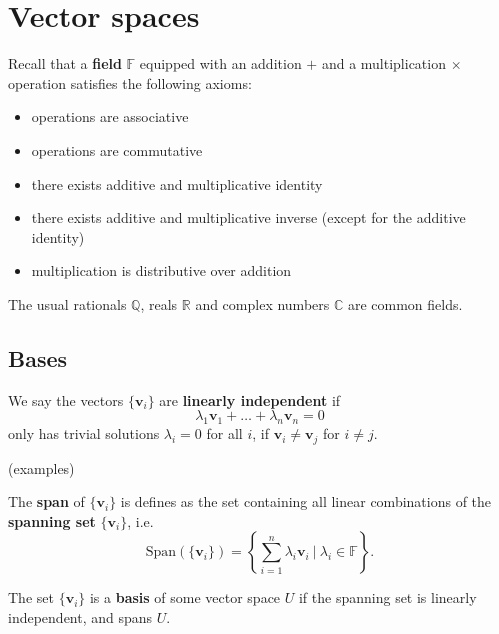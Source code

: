 \documentclass[letter-paper]{tufte-book}
\begin{document}

\chapter{Vector spaces}

Recall that a \textbf{field} $\mathbb{F}$ equipped with an addition $+$ and a
multiplication $\times$ operation satisfies the following axioms:
\begin{itemize}
  \item operations are associative
  \item operations are commutative
  \item there exists additive and multiplicative identity
  \item there exists additive and multiplicative inverse (except for the
  additive identity)
  \item multiplication is distributive over addition
\end{itemize}

The usual rationals $\mathbb{Q}$, reals $\mathbb{R}$ and complex numbers
$\mathbb{C}$ are common fields.


\section{Bases}

We say the vectors $\{\boldsymbol{v}_i\}$ are \textbf{linearly independent} if
\begin{equation}
  \lambda_1 \boldsymbol{v}_1 + \ldots + \lambda_n \boldsymbol{v}_n = 0
\end{equation}
only has trivial solutions $\lambda_i = 0$ for all $i$, if $\boldsymbol{v}_i
\neq \boldsymbol{v}_j$ for $i\neq j$.

(examples)

The \textbf{span} of $\{\boldsymbol{v}_i\}$ is defines as the set containing all
linear combinations of the \textbf{spanning set} $\{\boldsymbol{v}_i\}$, i.e.
\begin{equation}
  \mbox{Span}(\{\boldsymbol{v}_i\}) = \left\{ \sum_{i=1}^n \lambda_i \boldsymbol{v}_i \ |\ \lambda_i \in \mathbb{F} \right\}.
\end{equation}

The set $\{\boldsymbol{v}_i\}$ is a \textbf{basis} of some vector space $U$ if
the spanning set is linearly independent, and spans $U$.
\end{document}
